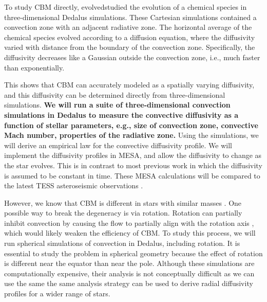 To study CBM directly, \citet{Lecoanet_2016a} evolvedstudied the evolution of a chemical species in three-dimensional Dedalus simulations.  These Cartesian simulations contained a convection zone with an adjacent radiative zone. The horizontal average of the chemical species evolved according to a diffusion equation, where the diffusivity varied with distance from the boundary of the convection zone. Specifically, the diffusivity decreases like a Gaussian outside the convection zone, i.e., much faster than exponentially.

This shows that CBM can accurately modeled as a spatially varying diffusivity, and this diffusivity can be determined directly from three-dimensional simulations. \textbf{We will run a suite of three-dimensional convection simulations in Dedalus to measure the convective diffusivity as a function of stellar parameters, e.g., size of convection zone, convective Mach number, properties of the radiative zone.} Using the simulations, we will derive an empirical law for the convective diffusivity profile. We will implement the diffusivity profiles in MESA, and allow the diffusivity to change as the star evolves. This is in contrast to most previous work in which the diffusivity is assumed to be constant in time. These MESA calculations will be compared to the latest TESS asteroseismic observations \citep[similar to][]{Ghasemi_2016}.

However, we know that CBM is different in stars with similar masses \citep{Stancliffe_2015}. One possible way to break the degeneracy is via rotation. Rotation can partially inhibit convection by causing the flow to partially align with the rotation axis \cite[e.g.,][]{Featherstone_2016}, which would likely weaken the efficiency of CBM. To study this process, we will run spherical simulations of convection in Dedalus, including rotation. It is essential to study the problem in spherical geometry because the effect of rotation is different near the equator than near the pole. Although these simulations are computationally expensive, their analysis is not conceptually difficult as we can use the same  the same analysis strategy can be used to derive radial diffusivity profiles for a wider range of stars.
